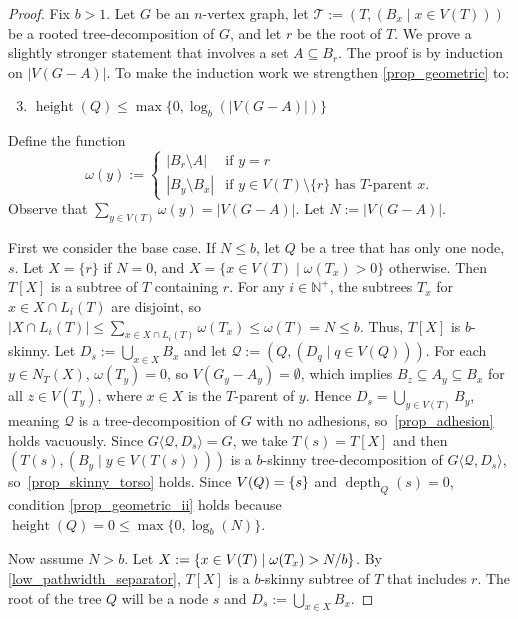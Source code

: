 \documentclass[twoside,leqno]{article}
\newcommand{\N}{\mathbb{N}}
\renewcommand{\le}{\leqslant}
\newcommand{\torso}[2]{{#1}\langle{#2}\rangle}
\DeclareMathOperator{\height}{height}
\DeclareMathOperator{\depth}{depth}
\DeclarePairedDelimiter{\set}{\{}{\}}
\begin{document}
\begin{proof}
  Fix $b>1$.    Let $G$ be an $n$-vertex graph, let $\mathcal{T}:=(T,(B_x\mid x\in V(T)))$ be a rooted tree-decomposition of $G$, and let $r$ be the root of $T$.  We prove a slightly stronger statement that involves a set $A\subseteq B_r$.  The proof is by induction on $|V(G-A)|$.   To make the induction work we strengthen \ref{prop_geometric} to:
  \begin{enumerate}[nosep,nolistsep,label=\rm(\alph*')]
    \setcounter{enumi}{2}
    \item\label{prop_geometric_ii} $\height(Q) \le \max\{0, \log_b(|V(G-A)|)\}$
  \end{enumerate}

  Define the function
  \[
    \omega(y) := \begin{cases}
      |B_r\setminus A|   & \text{if $y=r$}                                         \\
      |B_y\setminus B_x| & \text{if $y\in V(T)\setminus\{r\}$ has $T$-parent $x$.}
    \end{cases}
  \]
  Observe that $\sum_{y\in V(T)}\omega(y)=|V(G-A)|$. Let $N:=|V(G-A)|$.

  First we consider the base case. If $N\le b$, let $Q$ be a tree that has only one node, $s$. Let $X=\{r\}$ if $N=0$, and $X=\{x\in V(T)\mid \omega(T_x)>0\}$ otherwise. Then $T[X]$ is a subtree of $T$ containing $r$. For any $i\in\N^+$, the subtrees $T_x$ for $x\in X\cap L_i(T)$ are disjoint, so $|X\cap L_i(T)| \le \sum_{x\in X\cap L_i(T)}\omega(T_x) \le \omega(T) = N \le b$. Thus, $T[X]$ is $b$-skinny. Let $D_s:=\bigcup_{x\in X} B_x$ and let $\mathcal{Q}:=(Q,(D_q\mid q\in V(Q)))$. For each $y\in N_T(X)$, $\omega(T_y)=0$, so $V(G_y-A_y)=\emptyset$, which implies $B_z\subseteq A_y\subseteq B_x$ for all $z\in V(T_y)$, where $x\in X$ is the $T$-parent of $y$. Hence $D_s=\bigcup_{y\in V(T)} B_y$, meaning $\mathcal{Q}$ is a tree-decomposition of $G$ with no adhesions, so~\ref{prop_adhesion} holds vacuously. Since $\torso{G}{\mathcal{Q},D_s}=G$, we take $T(s)=T[X]$ and then $(T(s),(B_y\mid y\in V(T(s))))$ is a $b$-skinny tree-decomposition of $\torso{G}{\mathcal{Q},D_s}$, so~\ref{prop_skinny_torso} holds. Since $V(Q)=\set{s}$ and $\depth_Q(s)=0$, condition \ref{prop_geometric_ii} holds because $\height(Q)=0 \le \max\{0, \log_b(N)\}$.

  Now assume $N> b$. Let $X:=\set{x\in V(T)\mid  \omega(T_x)>N/b}$. By \cref{low_pathwidth_separator}, $T[X]$ is a $b$-skinny subtree of $T$ that includes $r$.  The root of the tree $Q$ will be a node $s$ and $D_s:=\bigcup_{x\in X} B_x$.


\end{proof}
\end{document}
